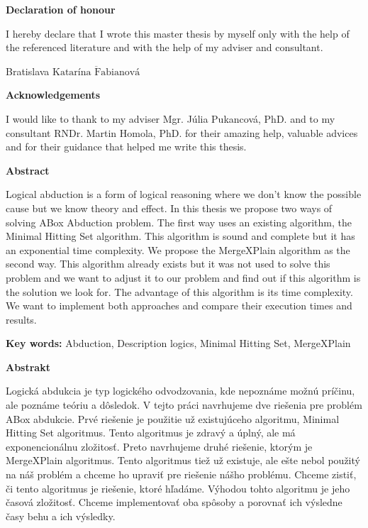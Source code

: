 \documentclass[12pt,a4paper]{article}
\newcommand{\textoverline}[1]{{\setul{-5em}{}$\overline{\mbox{#1}}$}}
\begin{document}
\pagebreak



\justify

\pagebreak
\thispagestyle{empty}
\vspace*{15cm}
{\large\bf Declaration of honour \par}
\vspace{0.8cm}
{\large{I hereby declare that I wrote this master thesis by myself only with the help of the referenced literature and with the help of my adviser and consultant.}} \par
\vspace{3cm}
{\large{Bratislava \hfill \textoverline{Katarína Fabianová}}}

\pagebreak
\thispagestyle{empty}
\par\vspace*{15cm}
{\large\bf \noindent Acknowledgements \par}
\vspace{0.8cm}
{\large{I would like to thank to my adviser Mgr. Júlia Pukancová, PhD. and to my consultant RNDr. Martin Homola, PhD. for their amazing help, valuable advices and for their guidance that helped me write this thesis.}}

\pagebreak
\thispagestyle{empty}
{\large\bf  \noindent Abstract \newline} 

Logical abduction is a form of logical reasoning where we don't know the possible cause but we know theory and effect. In this thesis we propose two ways of solving ABox Abduction problem. The first way uses an existing algorithm, the Minimal Hitting Set algorithm. This algorithm is sound and complete but it has an exponential time complexity. We propose the MergeXPlain algorithm as the second way. This algorithm already exists but it was not used to solve this problem and we want to adjust it to our problem and find out if this algorithm is the solution we look for. The advantage of this algorithm is its time complexity. We want to implement both approaches and compare their execution times and results. \newline

\noindent \textbf{Key words:}
Abduction, Description logics, Minimal Hitting Set, MergeXPlain

\pagebreak
\thispagestyle{empty}
{\large\bf  \noindent Abstrakt \newline} 

Logická abdukcia je typ logického odvodzovania, kde nepoznáme možnú príčinu, ale poznáme teóriu a dôsledok. V tejto práci navrhujeme dve riešenia pre problém ABox abdukcie. Prvé riešenie je použitie už existujúceho algoritmu, Minimal Hitting Set algoritmus. Tento algoritmus je zdravý a úplný, ale má exponencionálnu zložitosť. Preto navrhujeme druhé riešenie, ktorým je MergeXPlain algoritmus. Tento algoritmus tiež už existuje, ale ešte nebol použitý na náš problém a chceme ho upraviť pre riešenie nášho problému. Chceme zistiť, či tento algoritmus je riešenie, ktoré hľadáme. Výhodou tohto algoritmu je jeho časová zložitosť. Chceme implementovať oba spôsoby a porovnať ich výsledne časy behu a ich výsledky. \newline
\end{document}
